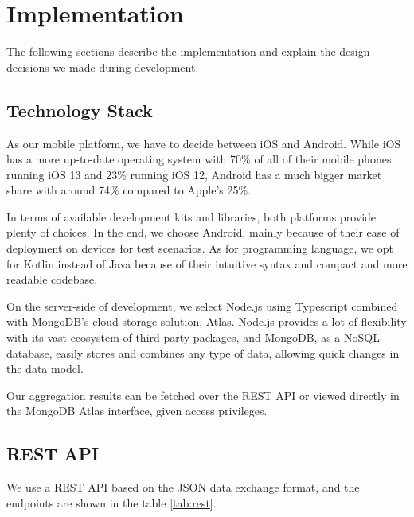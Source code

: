 
\chapter{Implementation}\label{chapter:implementation}

The following sections describe the implementation and explain the design decisions we made during development. 

\section{Technology Stack}

As our mobile platform, we have to decide between iOS and Android. While iOS has a more up-to-date operating system with 70\% of all of their mobile phones running iOS 13 and 23\% running iOS 12, Android has a much bigger market share with around 74\% compared to Apple's 25\%. 

In terms of available development kits and libraries, both platforms provide plenty of choices. In the end, we choose Android, mainly because of their ease of deployment on devices for test scenarios. As for programming language, we opt for Kotlin instead of Java because of their intuitive syntax and compact and more readable codebase.

On the server-side of development, we select Node.js using Typescript combined with MongoDB's cloud storage solution, Atlas. Node.js provides a lot of flexibility with its vast ecosystem of third-party packages, and MongoDB, as a NoSQL database, easily stores and combines any type of data, allowing quick changes in the data model.

Our aggregation results can be fetched over the REST API or viewed directly in the MongoDB Atlas interface, given access privileges.

\section{REST API}
\label{sec:api}
We use a REST API based on the JSON data exchange format, and the endpoints are shown in the table \ref{tab:rest}.

